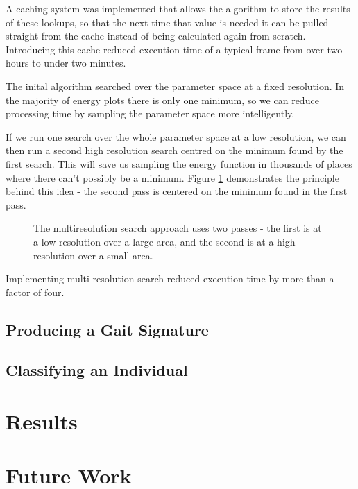 \documentclass[a4paper,12pt]{article}
\begin{document}
A caching system was implemented that allows the algorithm to store the results of these lookups, so that the next time that value is needed it can be pulled straight from the cache instead of being calculated again from scratch.
Introducing this cache reduced execution time of a typical frame from over two hours to under two minutes.

\bigskip
The inital algorithm searched over the parameter space at a fixed resolution.
In the majority of energy plots there is only one minimum, so we can reduce processing time by sampling the parameter space more intelligently.

If we run one search over the whole parameter space at a low resolution, we can then run a second high resolution search centred on the minimum found by the first search.
This will save us sampling the energy function in thousands of places where there can't possibly be a minimum.
Figure \ref{MultiResImages} demonstrates the principle behind this idea - the second pass is centered on the minimum found in the first pass.

\begin{figure}[bt]
	\centering
	\qquad
	\caption{The multiresolution search approach uses two passes - the first is at a low resolution over a large area,
		and the second is at a high resolution over a small area.}
	\label{MultiResImages}
\end{figure}

Implementing multi-resolution search reduced execution time by more than a factor of four.



\subsection{Producing a Gait Signature}

\subsection{Classifying an Individual}

\newpage
\section{Results}

\newpage
\section{Future Work}

\newpage

\end{document}

